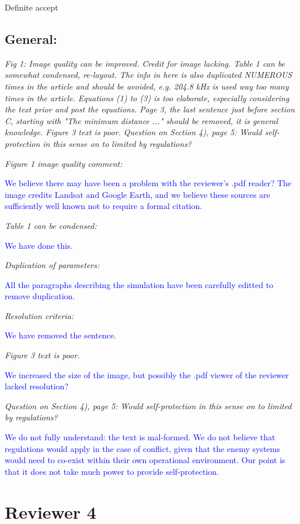 \documentclass[11pt]{amsart}
\begin{document}
Definite accept

\subsection{General:}

\emph{Fig 1: Image quality can be improved. Credit for image lacking. Table 1 can be somewhat condensed, re-layout. The info in here is also duplicated NUMEROUS times in the article and should be avoided, e.g. 204.8 kHz is used way too many times in the article. Equations (1) to (3) is too elaborate, especially considering the text prior and post the equations. Page 3, the last sentence just before section C, starting with "The minimum distance ..." should be removed, it is general knowledge. Figure 3 text is poor.  Question on Section 4), page 5: Would self-protection in this sense on to limited by regulations?}


\emph{Figure 1 image quality comment:} 

\textcolor{blue}{We believe there may have been a problem with the reviewer's .pdf reader? The image credits Landsat and Google Earth, and we believe these sources are sufficiently well known not to require a formal citation.}


\emph{Table 1 can be condensed:} 

\textcolor{blue}{We have done this.}


\emph{Duplication of parameters:} 

\textcolor{blue}{All the paragraphs describing the simulation have been carefully editted to remove duplication.}


\emph{Resolution criteria:}  

\textcolor{blue}{We have removed the sentence.}

\emph{Figure 3 text is poor.}

\textcolor{blue}{We increased the size of the image, but possibly the .pdf viewer of the reviewer lacked resolution?}

\emph{Question on Section 4), page 5: Would self-protection in this sense on to limited by regulations?}

\textcolor{blue}{We do not fully understand: the text is mal-formed. We do not believe that regulations would apply in the case of conflict, given that the enemy systems would need to co-exist within their own operational environment. Our point is that it does not take much power to provide self-protection.}

\section{Reviewer 4}
\end{document}
